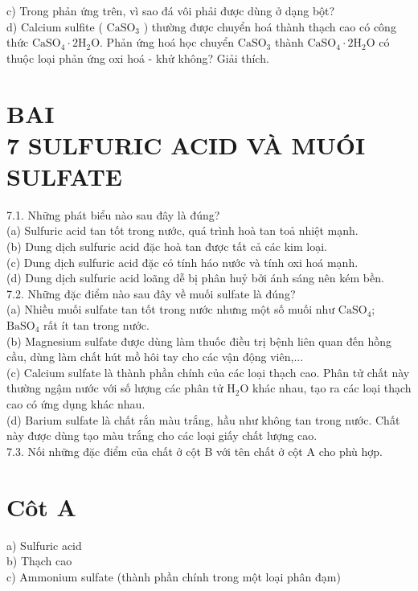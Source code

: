 \documentclass[10pt]{article}
\begin{document}
c) Trong phản ứng trên, vì sao đá vôi phải được dùng ở dạng bột?\\
d) Calcium sulfite ( $\mathrm{CaSO}_{3}$ ) thường được chuyển hoá thành thạch cao có công thức $\mathrm{CaSO}_{4} \cdot 2 \mathrm{H}_{2} \mathrm{O}$. Phản ứng hoá học chuyển $\mathrm{CaSO}_{3}$ thành $\mathrm{CaSO}_{4} \cdot 2 \mathrm{H}_{2} \mathrm{O}$ có thuộc loại phản ứng oxi hoá - khử không? Giải thích.

\section*{BAI \\
 7 SULFURIC ACID VÀ MUÓI SULFATE}
7.1. Những phát biểu nào sau đây là đúng?\\
(a) Sulfuric acid tan tốt trong nước, quá trình hoà tan toả nhiệt mạnh.\\
(b) Dung dịch sulfuric acid đặc hoà tan được tất cả các kim loại.\\
(c) Dung dịch sulfuric acid đặc có tính háo nước và tính oxi hoá mạnh.\\
(d) Dung dịch sulfuric acid loãng dễ bị phân huỷ bởi ánh sáng nên kém bền.\\
7.2. Những đặc điểm nào sau đây về muối sulfate là đúng?\\
(a) Nhiều muối sulfate tan tốt trong nước nhưng một số muối như $\mathrm{CaSO}_{4}$; $\mathrm{BaSO}_{4}$ rất ít tan trong nước.\\
(b) Magnesium sulfate được dùng làm thuốc điều trị bệnh liên quan đến hồng cầu, dùng làm chất hút mồ hôi tay cho các vận động viên,...\\
(c) Calcium sulfate là thành phần chính của các loại thạch cao. Phân tử chất này thường ngậm nước với số lượng các phân tử $\mathrm{H}_{2} \mathrm{O}$ khác nhau, tạo ra các loại thạch cao có ứng dụng khác nhau.\\
(d) Barium sulfate là chất rắn màu trắng, hầu như không tan trong nước. Chất này được dùng tạo màu trắng cho các loại giấy chất lượng cao.\\
7.3. Nối những đặc điểm của chất ở cột B với tên chất ở cột A cho phù hợp.

\section*{Côt A}
a) Sulfuric acid\\
b) Thạch cao\\
c) Ammonium sulfate (thành phần chính trong một loại phân đạm)
\end{document}
